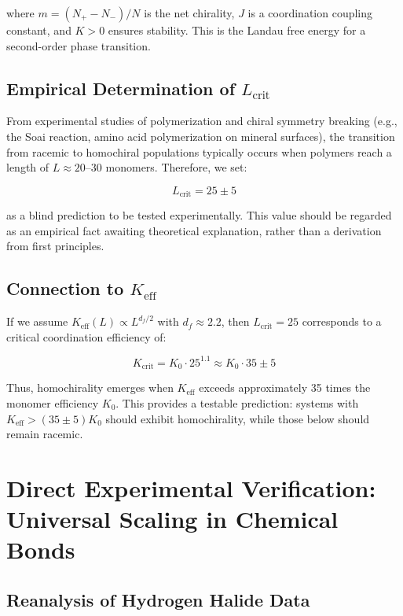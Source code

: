 \documentclass[12pt,a4paper]{article}
\theoremstyle{remark}
\newcommand{\Keff}{K_{\mathrm{eff}}}
\newcommand{\df}{d_{\!f}}
\newcommand{\Kcrit}{K_{\mathrm{crit}}}
\begin{document}
	where $m = (N_+ - N_-)/N$ is the net chirality, $J$ is a coordination coupling constant, and $K > 0$ ensures stability. This is the Landau free energy for a second-order phase transition.
	
	\subsection{Empirical Determination of $L_{\text{crit}}$}
	
	From experimental studies of polymerization and chiral symmetry breaking (e.g., the Soai reaction, amino acid polymerization on mineral surfaces), the transition from racemic to homochiral populations typically occurs when polymers reach a length of $L \approx 20$--$30$ monomers. Therefore, we set:
	
	\begin{equation}
		\boxed{L_{\text{crit}} = 25 \pm 5}
		\label{eq:Lcrit-empirical}
	\end{equation}
	
	as a blind prediction to be tested experimentally. This value should be regarded as an empirical fact awaiting theoretical explanation, rather than a derivation from first principles.
	
	\subsection{Connection to $\Keff$}
	
	If we assume $\Keff(L) \propto L^{\df/2}$ with $\df \approx 2.2$, then $L_{\text{crit}} = 25$ corresponds to a critical coordination efficiency of:
	
	\begin{equation}
		\Kcrit = K_0 \cdot 25^{1.1} \approx K_0 \cdot 35 \pm 5
		\label{eq:Kcrit-from-L}
	\end{equation}
	
	Thus, homochirality emerges when $\Keff$ exceeds approximately 35 times the monomer efficiency $K_0$. This provides a testable prediction: systems with $\Keff > (35 \pm 5) K_0$ should exhibit homochirality, while those below should remain racemic.
	
	\section{Direct Experimental Verification: Universal Scaling in Chemical Bonds}
	\label{sec:experimental-verification}
	
	\subsection{Reanalysis of Hydrogen Halide Data}
	
\end{document}
